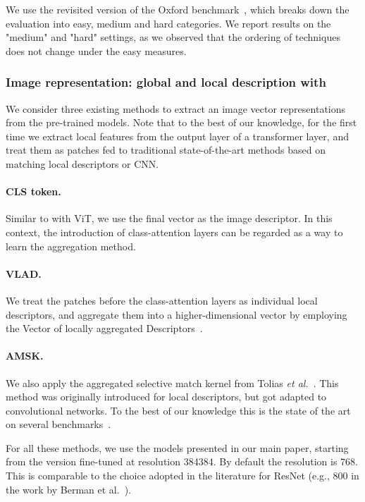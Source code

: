 We use the revisited version of the Oxford benchmark~\cite{radenovic2018revisiting}, which breaks down the evaluation into easy, medium and hard categories. 
We report results on the "medium" and "hard" settings, as we observed that the ordering of techniques does not change under the easy measures.



\subsubsection{Image representation: global and local description with \OURS} 

We consider three existing methods to extract an image vector representations from the pre-trained \OURS  models. 
Note that to the best of our knowledge, for the first time we extract local features from the output layer of a transformer layer, and treat them as patches fed to traditional state-of-the-art methods based on matching local descriptors or CNN. 
\paragraph{CLS token.} Similar to \citet{el2021training} with ViT, we use the final vector as the image descriptor. In this context, the introduction of class-attention layers can be regarded as a way to learn the aggregation method. 

\paragraph{VLAD. } We treat the patches before the class-attention layers as individual local descriptors, and aggregate them into a higher-dimensional vector by employing the Vector of locally aggregated Descriptors~\cite{jegou2012aggregating}. 

\paragraph{AMSK. } We also apply the aggregated selective match kernel from Tolias \emph{et al.}~\cite{tolias2016image}. This method was originally introduced for local descriptors, but got adapted to convolutional networks. To the best of our knowledge this is the state of the art on several benchmarks~\cite{tolias2020learning}.  
\medskip

For all these methods, we use the models presented in our main paper, starting from the version fine-tuned at resolution 384384. By default  the resolution is 768. This is comparable to the choice adopted in the literature for ResNet (e.g., 800 in the work by Berman et al.~\cite{berman2019multigrain}). 





